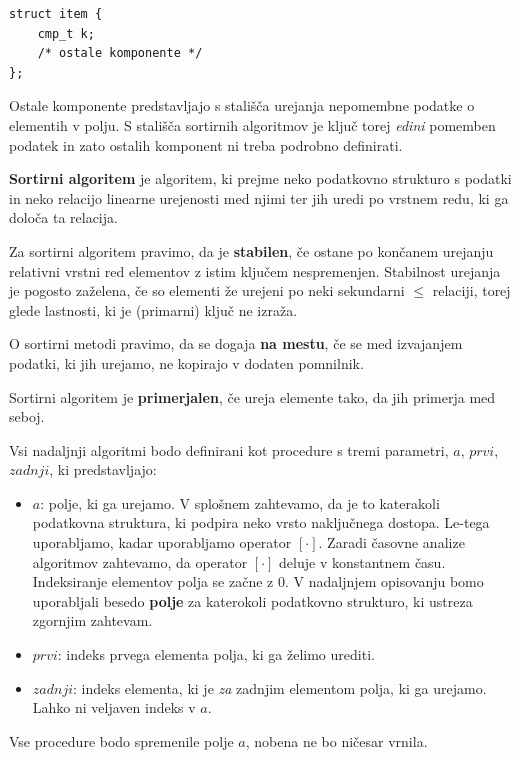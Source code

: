 \documentclass[a4paper,oneside,12pt]{article}
\begin{document}
\begin{lstlisting}
struct item {
    cmp_t k;
    /* ostale komponente */
};
\end{lstlisting}

Ostale komponente predstavljajo s stališča urejanja nepomembne podatke o elementih v
polju.
S stališča sortirnih algoritmov je ključ torej \emph{edini} pomemben podatek in zato
ostalih komponent ni treba podrobno definirati.

\begin{definicija}
  \textbf{Sortirni algoritem} je algoritem, ki prejme neko podatkovno strukturo s podatki
  in neko relacijo linearne urejenosti med njimi ter jih uredi po vrstnem redu, ki ga določa ta
  relacija.
\end{definicija}

\begin{definicija}
  Za sortirni algoritem pravimo, da je \textbf{stabilen}, če ostane po končanem urejanju
  relativni vrstni red elementov z istim ključem nespremenjen.
  Stabilnost urejanja je pogosto zaželena, če so elementi že urejeni po neki
  sekundarni $\leq$ relaciji, torej glede lastnosti, ki je (primarni) ključ ne izraža.
\end{definicija}

\begin{definicija}
  O sortirni metodi pravimo, da se dogaja \textbf{na mestu}, če se med izvajanjem podatki, ki
  jih urejamo, ne kopirajo v dodaten pomnilnik.
\end{definicija}

\begin{definicija}
  Sortirni algoritem je \textbf{primerjalen}, če ureja elemente tako, da jih primerja med seboj.
\end{definicija}


Vsi nadaljnji algoritmi bodo definirani kot procedure s tremi parametri, $a$, $prvi$,
$zadnji$, ki predstavljajo:
\begin{itemize}
  \item $a$: polje, ki ga urejamo. V splošnem zahtevamo, da je to katerakoli podatkovna
    struktura, ki podpira neko vrsto naključnega dostopa. Le-tega uporabljamo, kadar 
    uporabljamo operator $[\cdot]$. Zaradi časovne analize algoritmov zahtevamo, da operator 
    $[\cdot]$ deluje v konstantnem času. Indeksiranje elementov polja se začne z 0.
    V nadaljnjem opisovanju bomo uporabljali besedo
    \textbf{polje} za katerokoli podatkovno strukturo, ki ustreza zgornjim zahtevam.
  \item $prvi$: indeks prvega elementa polja, ki ga želimo urediti.
  \item $zadnji$: indeks elementa, ki je \emph{za} zadnjim elementom polja, ki ga urejamo. Lahko ni
    veljaven indeks v $a$.
\end{itemize}
Vse procedure bodo spremenile polje $a$, nobena ne bo ničesar vrnila.
\end{document}
